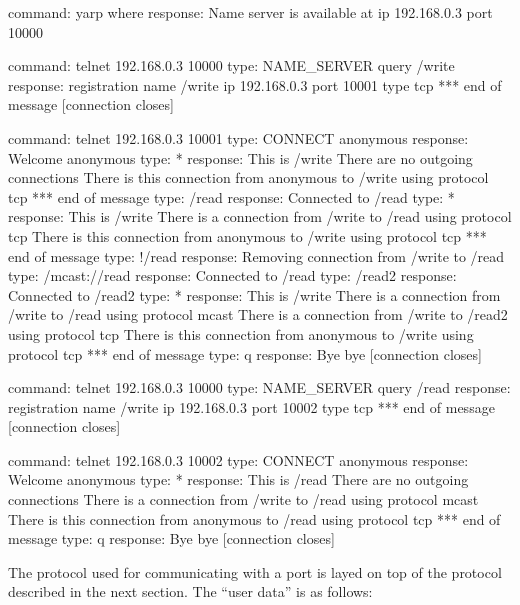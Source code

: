 \documentclass[a4]{article}
\begin{document}
\begin{code}
command:  yarp where
response: Name server is available at ip 192.168.0.3 port 10000

command:  telnet 192.168.0.3 10000
type:     NAME_SERVER query /write
response: registration name /write ip 192.168.0.3 port 10001 type tcp
          *** end of message
          [connection closes]

command:  telnet 192.168.0.3 10001
type:     CONNECT anonymous
response: Welcome anonymous
type:     *
response: This is /write
          There are no outgoing connections
          There is this connection from anonymous to /write using protocol tcp
          *** end of message
type:     /read
response: Connected to /read
type:     *
response: This is /write
          There is a connection from /write to /read using protocol tcp
          There is this connection from anonymous to /write using protocol tcp
          *** end of message
type:     !/read
response: Removing connection from /write to /read
type:     /mcast://read
response: Connected to /read
type:     /read2
response: Connected to /read2
type:     *
response: This is /write
          There is a connection from /write to /read using protocol mcast
          There is a connection from /write to /read2 using protocol tcp
          There is this connection from anonymous to /write using protocol tcp
          *** end of message
type:     q
response: Bye bye
          [connection closes]

command:  telnet 192.168.0.3 10000
type:     NAME_SERVER query /read
response: registration name /write ip 192.168.0.3 port 10002 type tcp
          *** end of message
          [connection closes]

command:  telnet 192.168.0.3 10002
type:     CONNECT anonymous
response: Welcome anonymous
type:     *
response: This is /read
          There are no outgoing connections
          There is a connection from /write to /read using protocol mcast
          There is this connection from anonymous to /read using protocol tcp
          *** end of message
type:     q
response: Bye bye
          [connection closes]

\end{code}


The protocol used for communicating with a port is layed on top of the
protocol described in the next section.  The ``user data'' is 
as follows:
\end{document}
